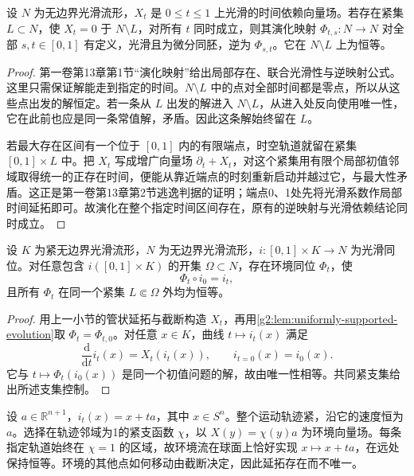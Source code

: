 \begin{lemma}\label{g2:lem:uniformly-supported-evolution}
	设 \(N\) 为无边界光滑流形，\(X_t\) 是 \(0\le t\le1\) 上光滑的时间依赖向量场。若存在紧集 \(L\subset N\)，使 \(X_t=0\) 于 \(N\setminus L\)，对所有 \(t\) 同时成立，则其演化映射 \(\Phi_{t,s}:N\to N\) 对全部 \(s,t\in[0,1]\) 有定义，光滑且为微分同胚，逆为 \(\Phi_{s,t}\)。它在 \(N\setminus L\) 上为恒等。
\end{lemma}
\begin{proof}
	第一卷第13章第1节“演化映射”给出局部存在、联合光滑性与逆映射公式。这里只需保证解能走到指定的时间。\(N\setminus L\) 中的点对全部时间都是零点，所以从这些点出发的解恒定。若一条从 \(L\) 出发的解进入 \(N\setminus L\)，从进入处反向使用唯一性，它在此前也应是同一条常值解，矛盾。因此这条解始终留在 \(L\)。

	若最大存在区间有一个位于 \([0,1]\) 内的有限端点，时空轨道就留在紧集 \([0,1]\times L\) 中。把 \(X_t\) 写成增广向量场 \(\partial_t+X_t\)，对这个紧集用有限个局部初值邻域取得统一的正存在时间，便能从靠近端点的时刻重新启动并越过它，与最大性矛盾。这正是第一卷第13章第2节逃逸判据的证明；端点0、1处先将光滑系数作局部时间延拓即可。故演化在整个指定时间区间存在，原有的逆映射与光滑依赖结论同时成立。
\end{proof}

\begin{theorem}[同位延拓定理]\label{g2:thm:isotopy-extension}
	设 \(K\) 为紧无边界光滑流形，\(N\) 为无边界光滑流形，\(i:[0,1]\times K\to N\) 为光滑同位。对任意包含 \(i([0,1]\times K)\) 的开集 \(\Omega\subset N\)，存在环境同位 \(\Phi_t\)，使
	\[
		\Phi_t\circ i_0=i_t,
	\]
	且所有 \(\Phi_t\) 在同一个紧集 \(L\Subset\Omega\) 外均为恒等。
\end{theorem}
\begin{proof}
	用上一小节的管状延拓与截断构造 \(X_t\)，再用\cref{g2:lem:uniformly-supported-evolution}取 \(\Phi_t=\Phi_{t,0}\)。对任意 \(x\in K\)，曲线 \(t\mapsto i_t(x)\) 满足
	\[
		\frac{\mathrm{d}}{\mathrm{d}t}i_t(x)=X_t(i_t(x)),\qquad i_{t=0}(x)=i_0(x).
	\]
	它与 \(t\mapsto\Phi_t(i_0(x))\) 是同一个初值问题的解，故由唯一性相等。共同紧支集给出所述支集控制。
\end{proof}

\begin{example}\label{g2:exm:translated-sphere-isotopy}
	设 \(a\in\mathbb R^{n+1}\)，\(i_t(x)=x+ta\)，其中 \(x\in S^n\)。整个运动轨迹紧，沿它的速度恒为 \(a\)。选择在轨迹邻域为1的紧支函数 \(\chi\)，以 \(X(y)=\chi(y)a\) 为环境向量场。每条指定轨道始终在 \(\chi=1\) 的区域，故环境流在球面上恰好实现 \(x\mapsto x+ta\)，在远处保持恒等。环境的其他点如何移动由截断决定，因此延拓存在而不唯一。
\end{example}

